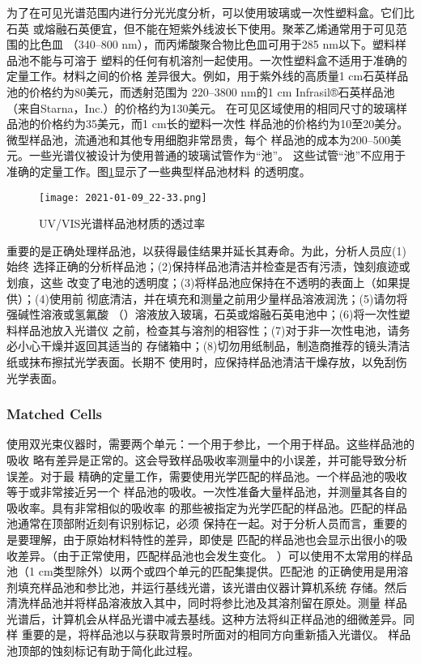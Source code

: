 为了在可见光谱范围内进行分光光度分析，可以使用玻璃或一次性塑料盒。它们比石英
或熔融石英便宜，但不能在短紫外线波长下使用。聚苯乙烯通常用于可见范围的比色皿
（340--800 nm），而丙烯酸聚合物比色皿可用于285 nm以下。塑料样品池不能与可溶于
塑料的任何有机溶剂一起使用。一次性塑料盒不适用于准确的定量工作。材料之间的价格
差异很大。例如，用于紫外线的高质量1 cm石英样品池的价格约为80美元，而透射范围为
220--3800 nm的1 cm Infrasil®石英样品池（来自Starna，Inc.）的价格约为130美元。
在可见区域使用的相同尺寸的玻璃样品池的价格约为35美元，而1 cm长的塑料一次性
样品池的价格约为10至20美分。微型样品池，流通池和其他专用细胞非常昂贵，每个
样品池的成本为200--500美元。一些光谱仪被设计为使用普通的玻璃试管作为“池”。
这些试管“池”不应用于准确的定量工作。图\ref{fig:5.27}显示了一些典型样品池材料
的透明度。
\begin{figure}[htpb]
    \centering
    \texttt{[image: 2021-01-09\_22-33.png]}
    \caption{UV/VIS光谱样品池材质的透过率}
    \label{fig:5.27}
\end{figure}

重要的是正确处理样品池，以获得最佳结果并延长其寿命。为此，分析人员应(1)始终
选择正确的分析样品池；(2)保持样品池清洁并检查是否有污渍，蚀刻痕迹或划痕，这些
改变了电池的透明度；(3)将样品池应保持在不透明的表面上（如果提供）；(4)使用前
彻底清洁，并在填充和测量之前用少量样品溶液润洗；(5)请勿将强碱性溶液或氢氟酸
（）溶液放入玻璃，石英或熔融石英电池中；(6)将一次性塑料样品池放入光谱仪
之前，检查其与溶剂的相容性；(7)对于非一次性电池，请务必小心干燥并返回其适当的
存储箱中；(8)切勿用纸制品，制造商推荐的镜头清洁纸或抹布擦拭光学表面。长期不
使用时，应保持样品池清洁干燥存放，以免刮伤光学表面。
\subsubsection{Matched Cells}
使用双光束仪器时，需要两个单元：一个用于参比，一个用于样品。这些样品池的吸收
略有差异是正常的。这会导致样品吸收率测量中的小误差，并可能导致分析误差。对于最
精确的定量工作，需要使用光学匹配的样品池。一个样品池的吸收等于或非常接近另一个
样品池的吸收。一次性准备大量样品池，并测量其各自的吸收率。具有非常相似的吸收率
的那些被指定为光学匹配的样品池。匹配的样品池通常在顶部附近刻有识别标记，必须
保持在一起。对于分析人员而言，重要的是要理解，由于原始材料特性的差异，即使是
匹配的样品池也会显示出很小的吸收差异。（由于正常使用，匹配样品池也会发生变化。
）可以使用不太常用的样品池（1 cm类型除外）以两个或四个单元的匹配集提供。匹配池
的正确使用是用溶剂填充样品池和参比池，并运行基线光谱，该光谱由仪器计算机系统
存储。然后清洗样品池并将样品溶液放入其中，同时将参比池及其溶剂留在原处。测量
样品光谱后，计算机会从样品光谱中减去基线。这种方法将纠正样品池的细微差异。同样
重要的是，将样品池以与获取背景时所面对的相同方向重新插入光谱仪。
样品池顶部的蚀刻标记有助于简化此过程。

